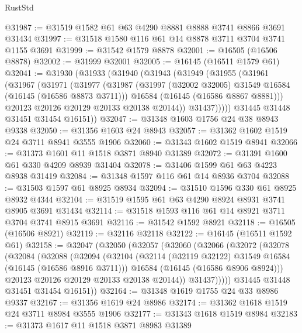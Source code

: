\begin{lexlean}{RustStd}
\begin{coremodule}
@31987 := @31519 @1582 @61 @63 @4290 @8881 @8888 @3741 @8866 @3691 @31434
@31997 := @31518 @1580 @116 @61 @14 @8878 @3711 @3704 @3741 @1155 @3691
@31999 := @31542 @1579 @8878
@32001 := @16505 (@16506 @8878)
@32002 := @31999 @32001
@32005 := @16145 (@16511 @1579 @61)
@32041 := @31930
    (@31933
      (@31940
        (@31943
          (@31949
            (@31955
              (@31961
                (@31967
                  (@31971
                    (@31977
                      (@31987
                        (@31997 (@32002 @32005) @31549 @16584 (@16145 (@16586 @8873 @3711)))
                        @16584
                        (@16145 (@16586 @8867 @8881)))
                      @20123
                      @20126
                      @20129
                      @20133
                      @20138
                      @20144))
                  @31437)))))
        @31445
        @31448
        @31451
        @31454
        @16151))
@32047 := @31348 @1603 @1756 @24 @38 @8943 @9338
@32050 := @31356 @1603 @24 @8943
@32057 := @31362 @1602 @1519 @24 @3711 @8941 @3555 @1906
@32060 := @31343 @1602 @1519 @8941
@32066 := @31373 @1601 @11 @1518 @3871 @8940 @31389
@32072 := @31391 @1600 @61 @330 @4209 @8939 @31404
@32078 := @31406 @1599 @61 @63 @4223 @8938 @31419
@32084 := @31348 @1597 @116 @61 @14 @8936 @3704
@32088 := @31503 @1597 @61 @8925 @8934
@32094 := @31510 @1596 @330 @61 @8925 @8932 @4344
@32104 := @31519 @1595 @61 @63 @4290 @8924 @8931 @3741 @8905 @3691 @31434
@32114 := @31518 @1593 @116 @61 @14 @8921 @3711 @3704 @3741 @8915 @3691
@32116 := @31542 @1592 @8921
@32118 := @16505 (@16506 @8921)
@32119 := @32116 @32118
@32122 := @16145 (@16511 @1592 @61)
@32158 := @32047
    (@32050
      (@32057
        (@32060
          (@32066
            (@32072
              (@32078
                (@32084
                  (@32088
                    (@32094
                      (@32104
                        (@32114 (@32119 @32122) @31549 @16584 (@16145 (@16586 @8916 @3711)))
                        @16584
                        (@16145 (@16586 @8906 @8924)))
                      @20123
                      @20126
                      @20129
                      @20133
                      @20138
                      @20144))
                  @31437)))))
        @31445
        @31448
        @31451
        @31454
        @16151))
@32164 := @31348 @1619 @1755 @24 @33 @8986 @9337
@32167 := @31356 @1619 @24 @8986
@32174 := @31362 @1618 @1519 @24 @3711 @8984 @3555 @1906
@32177 := @31343 @1618 @1519 @8984
@32183 := @31373 @1617 @11 @1518 @3871 @8983 @31389

\end{coremodule}
\end{lexlean}
